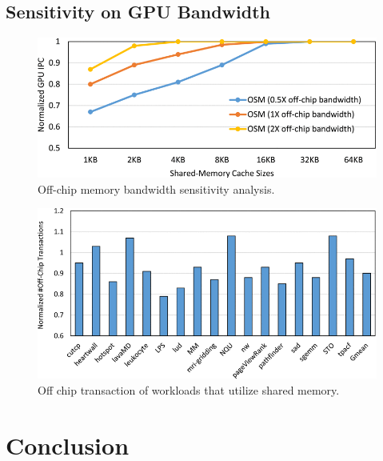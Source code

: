 \documentclass[
    fontset=fandol,
    xcolor=svgnames %
]{ctexbeamer}
\begin{document}
\subsection{Sensitivity on GPU Bandwidth}

\begin{frame}

    \begin{figure}
        \includegraphics[width=1\textwidth]{assets/figure/sadro17-3154315-large.png}
        \caption{Off-chip memory bandwidth sensitivity analysis.}
    \end{figure}

\end{frame}

\begin{frame}

    \begin{figure}
        \includegraphics[width=1\textwidth]{assets/figure/sadro18-3154315-large.png}
        \caption{Off chip transaction of workloads that utilize shared memory.}
    \end{figure}

\end{frame}

\section{Conclusion}
\end{document}
